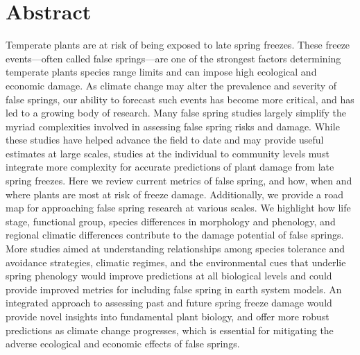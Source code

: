 \documentclass{article}\usepackage[]{graphicx}\usepackage[]{color}
\begin{document}
\section*{Abstract} %
Temperate plants are at risk of being exposed to late spring freezes. These freeze events---often called false springs---are one of the strongest factors determining temperate plants species range limits and can impose high ecological and economic damage. As climate change may alter the prevalence and severity of false springs, our ability to forecast such events has become more critical, and has led to a growing body of research. Many false spring studies largely simplify the myriad complexities involved in assessing false spring risks and damage. While these studies have helped advance the field to date and may provide useful estimates at large scales, studies at the individual to community levels must integrate more complexity for accurate predictions of plant damage from late spring freezes. Here we review current metrics of false spring, and how, when and where plants are most at risk of freeze damage. Additionally, we provide a road map for approaching false spring research at various scales. We highlight how life stage, functional group, species differences in morphology and phenology, and regional climatic differences contribute to the damage potential of false springs. More studies aimed at understanding relationships among species tolerance and avoidance strategies, climatic regimes, and the environmental cues that underlie spring phenology would improve predictions at all biological levels and could provide improved metrics for including false spring in earth system models. An integrated approach to assessing past and future spring freeze damage would provide novel insights into fundamental plant biology, and offer more robust predictions as climate change progresses, which is essential for mitigating the adverse ecological and economic effects of false springs. 


\end{document}
